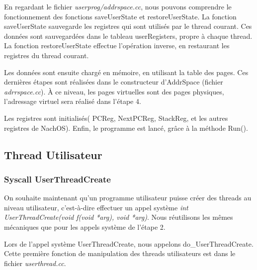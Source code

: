 \documentclass[a4paper,10pt]{article}
\begin{document}
En regardant le fichier \textit{userprog/addrspace.cc}, nous pouvons comprendre le fonctionnement des fonctions saveUserState et restoreUserState.
La fonction saveUserState sauvegarde les registres qui sont utilisés par le thread courant. Ces données sont sauvegardées dans le tableau  userRegisters,
propre à chaque thread. La fonction restoreUserState effectue l'opération inverse, en restaurant les registres du thread courant.

Les données sont ensuite chargé en mémoire, en utilisant la table des pages. Ces dernières étapes sont réalisées dans le constructeur d'AddrSpace (fichier \textit{adrrspace.cc}).
À ce niveau, les pages virtuelles sont des pages physiques, l'adressage virtuel sera réalisé dans l'étape 4.

\vspace{0.5cm}

Les registres sont initialisés( PCReg, NextPCReg, StackReg, et les autres registres de NachOS).
Enfin, le programme est lancé, grâce à la méthode Run().
\newpage
\subsection{Thread Utilisateur}
\subsubsection{Syscall UserThreadCreate}
On souhaite maintenant qu’un programme utilisateur puisse créer des threads au niveau utilisateur,
c’est-à-dire effectuer un appel système \textit{int UserThreadCreate(void f(void *arg), void *arg)}.
Nous réutilisons les mêmes mécaniques que pour les appels système de l'étape 2.

Lors de l'appel système UserThreadCreate, nous appelons do\_UserThreadCreate.
Cette première fonction de manipulation des threads utilisateurs est dans le fichier \textit{userthread.cc}.
\end{document}

